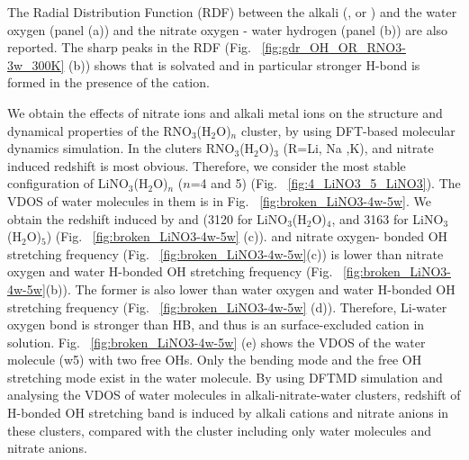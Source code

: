  The Radial Distribution Function (RDF) between the alkali (\li, \na or \pot) 
 and the water oxygen  (panel (a)) and the nitrate oxygen - water  hydrogen (panel (b)) are also reported. 
 The sharp peaks in the RDF (Fig. ~\ref{fig:gdr_OH_OR_RNO3-3w_300K} (b)) 
 shows that \nitrate is solvated and in particular stronger H-bond is formed in the presence of the cation. 

We obtain the effects of nitrate ions and alkali metal ions on the structure and dynamical properties of the RNO$_3$(H$_2$O)$_n$ cluster, by using DFT-based molecular dynamics simulation.
In the cluters RNO$_3$(H$_2$O)$_3$ (R=Li, Na ,K), \Li and nitrate induced redshift is most obvious. 
Therefore, we consider the most stable configuration of LiNO$_3$(H$_2$O)$_n$ ($n$=4 and 5)
(Fig. ~\ref{fig:4_LiNO3_5_LiNO3}).
The VDOS of water molecules in them is in Fig. ~\ref{fig:broken_LiNO3-4w-5w}. 
We obtain the redshift induced by \Li and \nitrate (3120 \cm for 
LiNO$_3$(H$_2$O)$_4$, and 3163 \cm for LiNO$_3$(H$_2$O)$_5$) (Fig.  ~\ref{fig:broken_LiNO3-4w-5w} (c)).
\Li and nitrate oxygen- bonded OH stretching frequency (Fig. ~\ref{fig:broken_LiNO3-4w-5w}(c))
is lower than nitrate oxygen and water H-bonded OH stretching frequency
(Fig. ~\ref{fig:broken_LiNO3-4w-5w}(b)).
The former is also lower than water oxygen and water H-bonded OH stretching frequency (Fig. ~\ref{fig:broken_LiNO3-4w-5w} (d)). 
Therefore, Li-water oxygen bond is stronger than HB, and thus \Li is an surface-excluded cation in \LiN solution. 
Fig. ~\ref{fig:broken_LiNO3-4w-5w} (e) 
shows the VDOS of the water molecule (w5) with two free OHs. 
Only the bending mode and the free OH stretching mode exist in the water molecule.
%
By using DFTMD simulation and analysing the VDOS of water molecules in alkali-nitrate-water clusters, 
redshift of H-bonded OH stretching band is induced by alkali cations and nitrate anions in these clusters,
compared with the cluster including only water molecules and nitrate anions.

